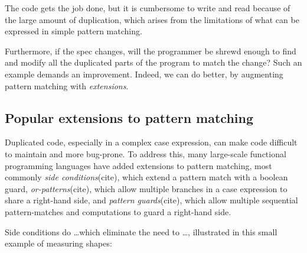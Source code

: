 \documentclass[article,screen,12pt, nonacm]{acmart}
\begin{document}
    The code gets the job done, but it is cumbersome to write and read because
    of the large amount of duplication, which arises from the limitations of
    what can be expressed in simple pattern matching. 
    
    Furthermore, if the spec changes, will the programmer be shrewd enough to
    find and modify all the duplicated parts of the program to match the change?
    Such an example demands an improvement. Indeed, we can do better, by 
    augmenting pattern matching with \textit{extensions}. 


    \subsection{Popular extensions to pattern matching}
    \label{extensions}

    


    Duplicated code, especially in a complex case expression, can make code
    difficult to maintain and more bug-prone. To address this, many large-scale
    functional programming languages have added extensions to pattern matching,
    most commonly \textit{side conditions}(cite), which extend a pattern match with a
    boolean guard, \textit{or-patterns}(cite), which allow multiple branches in a case
    expression to share a right-hand side, and \textit{pattern guards}(cite), which
    allow multiple sequential pattern-matches and computations to guard a
    right-hand side. 

    Side conditions do \dots which eliminate the need to \dots, 
    illustrated in this small example of measuring shapes: 

\end{document}
